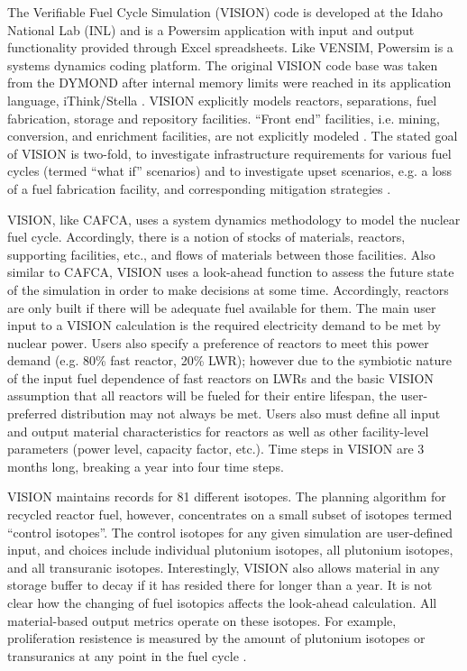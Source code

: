 The Verifiable Fuel Cycle Simulation (VISION) code is developed at the Idaho
National Lab (INL) and is a Powersim \cite{studio_powersim_2003} application
with input and output functionality provided through Excel spreadsheets. Like
VENSIM, Powersim is a systems dynamics coding platform. The original VISION code
base was taken from the DYMOND \cite{moisseytsev_dymond_2001} after internal
memory limits were reached in its application language, iThink/Stella
\cite{richmond_ithink_2004}. VISION explicitly models reactors, separations, fuel
fabrication, storage and repository facilities. ``Front end'' facilities,
i.e. mining, conversion, and enrichment facilities, are not explicitly modeled
\cite{guerin_benchmark_2009}. The stated goal of VISION is two-fold, to
investigate infrastructure requirements for various fuel cycles (termed ``what
if'' scenarios) \cite{jacobson_verifiable_2010} and to investigate upset
scenarios, e.g. a loss of a fuel fabrication facility, and corresponding
mitigation strategies \cite{schweitzer_improved_2008}.

VISION, like CAFCA, uses a system dynamics methodology to model the nuclear fuel
cycle. Accordingly, there is a notion of stocks of materials, reactors,
supporting facilities, etc., and flows of materials between those
facilities. Also similar to CAFCA, VISION uses a look-ahead function to assess
the future state of the simulation in order to make decisions at some
time. Accordingly, reactors are only built if there will be adequate fuel
available for them. The main user input to a VISION calculation is the required
electricity demand to be met by nuclear power. Users also specify a preference
of reactors to meet this power demand (e.g. 80\% fast reactor, 20\% LWR);
however due to the symbiotic nature of the input fuel dependence of fast
reactors on LWRs and the basic VISION assumption that all reactors will be
fueled for their entire lifespan, the user-preferred distribution may not always
be met. Users also must define all input and output material characteristics for
reactors as well as other facility-level parameters (power level, capacity
factor, etc.). Time steps in VISION are 3 months long, breaking a year into four
time steps.

VISION maintains records for 81 different isotopes. The planning algorithm for
recycled reactor fuel, however, concentrates on a small subset of isotopes
termed ``control isotopes''. The control isotopes for any given simulation are
user-defined input, and choices include individual plutonium isotopes, all
plutonium isotopes, and all transuranic isotopes. Interestingly, VISION also
allows material in any storage buffer to decay if it has resided there for
longer than a year. It is not clear how the changing of fuel isotopics affects
the look-ahead calculation. All material-based output metrics operate on these
isotopes. For example, proliferation resistence is measured by the amount of
plutonium isotopes or transuranics at any point in the fuel cycle
\cite{yacout_vision_2006}.


